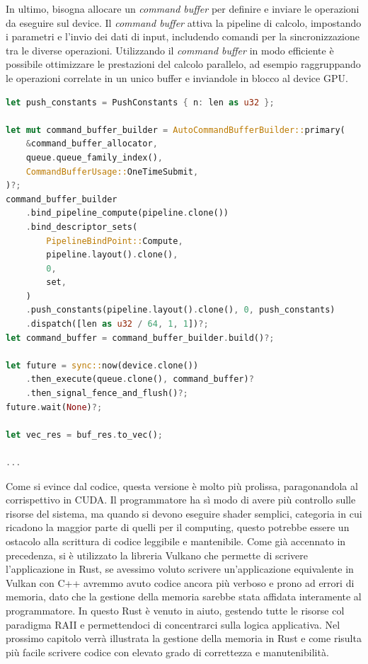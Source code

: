 In ultimo, bisogna allocare un \textit{command buffer} per definire e inviare le operazioni da eseguire sul device. Il \textit{command buffer} attiva la pipeline di calcolo, impostando i parametri e l'invio dei dati di input, includendo comandi per la sincronizzazione tra le diverse operazioni. Utilizzando il \textit{command buffer} in modo efficiente è possibile ottimizzare le prestazioni del calcolo parallelo, ad esempio raggruppando le operazioni correlate in un unico buffer e inviandole in blocco al device GPU.

\vspace{5mm}
\begin{lstlisting}[language=Rust, caption=Command buffer e dispatch, label=lis:vulkan_dispatch]
let push_constants = PushConstants { n: len as u32 };

let mut command_buffer_builder = AutoCommandBufferBuilder::primary(
    &command_buffer_allocator,
    queue.queue_family_index(),
    CommandBufferUsage::OneTimeSubmit,
)?;
command_buffer_builder
    .bind_pipeline_compute(pipeline.clone())
    .bind_descriptor_sets(
        PipelineBindPoint::Compute,
        pipeline.layout().clone(),
        0,
        set,
    )
    .push_constants(pipeline.layout().clone(), 0, push_constants)
    .dispatch([len as u32 / 64, 1, 1])?;
let command_buffer = command_buffer_builder.build()?;

let future = sync::now(device.clone())
    .then_execute(queue.clone(), command_buffer)?
    .then_signal_fence_and_flush()?;
future.wait(None)?;

let vec_res = buf_res.to_vec();

...
\end{lstlisting}
\vspace{5mm}

Come si evince dal codice, questa versione è molto più prolissa, paragonandola al corrispettivo in CUDA. Il programmatore ha sì modo di avere più controllo sulle risorse del sistema, ma quando si devono eseguire shader semplici, categoria in cui ricadono la maggior parte di quelli per il computing, questo potrebbe essere un ostacolo alla scrittura di codice leggibile e mantenibile. Come già accennato in precedenza, si è utilizzato la libreria Vulkano che permette di scrivere l'applicazione in Rust, se avessimo voluto scrivere un'applicazione equivalente in Vulkan con C++ avremmo avuto codice ancora più verboso e prono ad errori di memoria, dato che la gestione della memoria sarebbe stata affidata interamente al programmatore. In questo Rust è venuto in aiuto, gestendo tutte le risorse col paradigma RAII e permettendoci di concentrarci sulla logica applicativa. Nel prossimo capitolo verrà illustrata la gestione della memoria in Rust e come risulta più facile scrivere codice con elevato grado di correttezza e manutenibilità.


